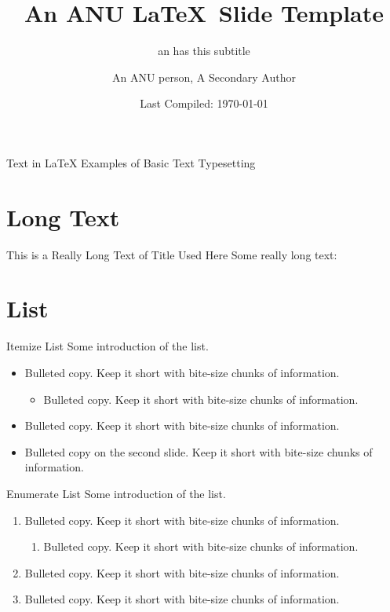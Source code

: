 \documentclass{anu-slide} %
\title{An ANU \LaTeX\ Slide Template}
\subtitle{an has this subtitle}
\author{An ANU person\texorpdfstring{\footnotemark[1]}{}, A Secondary Author\texorpdfstring{\footnotemark[2]}{}}
\institute{\texorpdfstring{\footnotemark[1]}{}Australian National University, \texorpdfstring{\footnotemark[2]}{}Collaborating Institution}
\date{Last Compiled: \today}
\begin{document}
\begin{titleframe}{}
    \maketitle
\end{titleframe}

\begin{titleframe}{Text in \LaTeX}
    Examples of Basic Text Typesetting
\end{titleframe}

\section{Long Text}

\begin{frame}{This is a Really Long Text of Title Used Here}
    Some really long text:
    
    \bigskip
    
    \lipsum[2]
\end{frame}

\section{List}

\begin{frame}{Itemize List}
    Some introduction of the list.
    \begin{itemize}
        \item Bulleted copy. Keep it short with bite-size chunks of information.
        \begin{itemize}
            \item Bulleted copy. Keep it short with bite-size chunks of information.
        \end{itemize}
        \item Bulleted copy. Keep it short with bite-size chunks of information.
        \pause\item Bulleted copy on the second slide. Keep it short with bite-size chunks of information.
    \end{itemize}
\end{frame}

\begin{frame}{Enumerate List}
    Some introduction of the list.
    \begin{enumerate}
        \item Bulleted copy. Keep it short with bite-size chunks of information.
        \begin{enumerate}
            \item Bulleted copy. Keep it short with bite-size chunks of information.
        \end{enumerate}
        \item Bulleted copy. Keep it short with bite-size chunks of information.
        \item Bulleted copy. Keep it short with bite-size chunks of information.
    \end{enumerate}
\end{frame}
\end{document}
